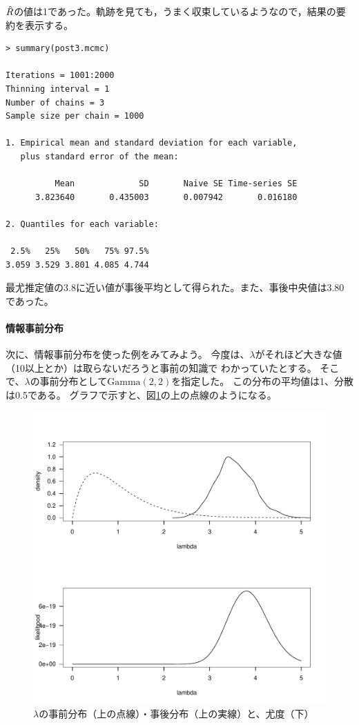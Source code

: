 \documentclass[11pt,uplatex]{jsarticle}
\begin{document}
$\Hat{R}$の値は1であった。軌跡を見ても，うまく収束しているようなので，結果の要約を表示する。

\begin{lstlisting}
> summary(post3.mcmc)

Iterations = 1001:2000
Thinning interval = 1 
Number of chains = 3 
Sample size per chain = 1000 

1. Empirical mean and standard deviation for each variable,
   plus standard error of the mean:

          Mean             SD       Naive SE Time-series SE 
      3.823640       0.435003       0.007942       0.016180 

2. Quantiles for each variable:

 2.5%   25%   50%   75% 97.5% 
3.059 3.529 3.801 4.085 4.744 

\end{lstlisting}

最尤推定値の3.8に近い値が事後平均として得られた。また、事後中央値は3.80であった。

\paragraph{情報事前分布}

次に、情報事前分布を使った例をみてみよう。
今度は、$\lambda$がそれほど大きな値（10以上とか）は取らないだろうと事前の知識で
わかっていたとする。
そこで、$\lambda$の事前分布として$\mathrm{Gamma}(2, 2)$を指定した。
この分布の平均値は1、分散は0.5である。
グラフで示すと、図\ref{prior_posterior}の上の点線のようになる。

\begin{figure}[htbp]
	\begin{center}
		\includegraphics[bb=0 0 480 480, clip, width=320 bp]{example1-4.pdf}
	\end{center}
	\caption{$\lambda$の事前分布（上の点線）・事後分布（上の実線）と、尤度（下）}
	\label{prior_posterior}
\end{figure}
\end{document}
